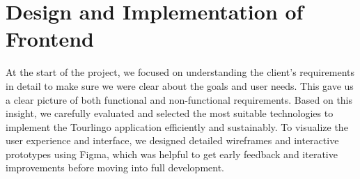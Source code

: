 \chapter{Design and Implementation of Frontend}

At the start of the project, we focused on understanding the client's requirements in detail to make sure we were clear about the goals and user needs. This gave us a clear picture of both functional and non-functional requirements. Based on this insight, we carefully evaluated and selected the most suitable technologies to implement the Tourlingo application efficiently and sustainably. To visualize the user experience and interface, we designed detailed wireframes and interactive prototypes using Figma, which was helpful to get early feedback and iterative improvements before moving into full development.





